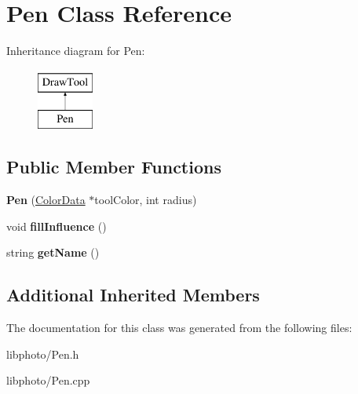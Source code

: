 \hypertarget{classPen}{\section{Pen Class Reference}
\label{classPen}
}
Inheritance diagram for Pen\-:\begin{figure}[H]
\begin{center}
\leavevmode
\includegraphics[height=2.000000cm]{classPen}
\end{center}
\end{figure}
\subsection*{Public Member Functions}
\begin{DoxyCompactItemize}
\item 
\hypertarget{classPen_aae1e2ae7aead4ede7484af6554fd93d7}{{\bfseries Pen} (\hyperlink{classColorData}{Color\-Data} $\ast$tool\-Color, int radius)}\label{classPen_aae1e2ae7aead4ede7484af6554fd93d7}

\item 
\hypertarget{classPen_a3a09d9bed4cefec347fb4dd759faf44a}{void {\bfseries fill\-Influence} ()}\label{classPen_a3a09d9bed4cefec347fb4dd759faf44a}

\item 
\hypertarget{classPen_afece6e7d7f6e22da50d45c585a7ad6b2}{string {\bfseries get\-Name} ()}\label{classPen_afece6e7d7f6e22da50d45c585a7ad6b2}

\end{DoxyCompactItemize}
\subsection*{Additional Inherited Members}


The documentation for this class was generated from the following files\-:\begin{DoxyCompactItemize}
\item 
libphoto/Pen.\-h\item 
libphoto/Pen.\-cpp\end{DoxyCompactItemize}
